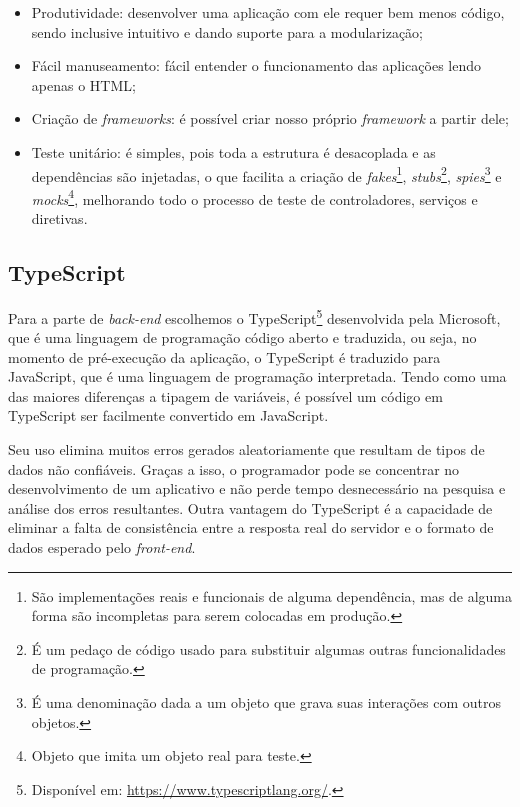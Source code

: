 \begin{itemize}
    \item Produtividade: desenvolver uma aplicação com ele requer bem menos código, sendo inclusive intuitivo e dando suporte para a modularização; 
    \item Fácil manuseamento: fácil entender o funcionamento das aplicações lendo apenas o HTML;   
    \item Criação de \textit{frameworks}: é possível criar nosso próprio \textit{framework} a partir dele;   
    \item Teste unitário: é simples, pois toda a estrutura é desacoplada e as dependências são injetadas, o que facilita a criação de \textit{fakes}\footnote{São implementações reais e funcionais de alguma dependência, mas de alguma forma são incompletas para serem colocadas em produção.}, \textit{stubs}\footnote{É um pedaço de código usado para substituir algumas outras funcionalidades de programação.}, \textit{spies}\footnote{É uma denominação dada a um objeto que grava suas interações com outros objetos.} e \textit{mocks}\footnote{Objeto que imita um objeto real para teste.}, melhorando todo o processo de teste de controladores, serviços e diretivas. 
\end{itemize}

\subsection{TypeScript}
\label{ssec:TypeScript}
Para a parte de \textit{back-end} escolhemos o TypeScript\footnote{Disponível em: \url{https://www.typescriptlang.org/}.} desenvolvida pela Microsoft, que é uma linguagem de programação código aberto e traduzida, ou seja, no momento de pré-execução da aplicação, o TypeScript é traduzido para JavaScript, que é uma linguagem de programação interpretada. Tendo como uma das maiores diferenças a tipagem de variáveis, é possível um código em TypeScript ser facilmente convertido em JavaScript. 

Seu uso elimina muitos erros gerados aleatoriamente que resultam de tipos de dados não confiáveis. Graças a isso, o programador pode se concentrar no desenvolvimento de um aplicativo e não perde tempo desnecessário na pesquisa e análise dos erros resultantes. Outra vantagem do TypeScript é a capacidade de eliminar a falta de consistência entre a resposta real do servidor e o formato de dados esperado pelo \textit{front-end}.\cite{Jakub2019TypeScript}

